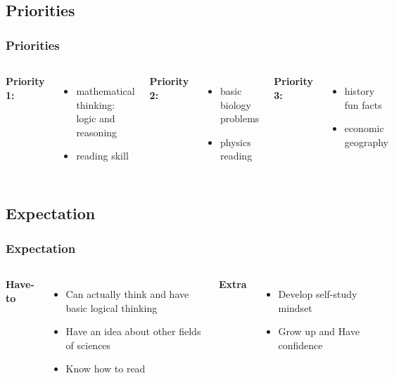 \documentclass{beamer}
\begin{document}
\subsection{Priorities}
\begin{frame}
    \frametitle{Priorities}
    \begin{columns}
        \textbf{Priority 1:}
        \begin{itemize}
            \item mathematical thinking: logic and reasoning
            \item reading skill
        \end{itemize}
        
        \textbf{Priority 2:}
        \begin{itemize}
            \item basic biology problems
            \item physics reading
        \end{itemize}
        \textbf{Priority 3:}
        \begin{itemize}
            \item history fun facts
            \item economic geography
        \end{itemize}
        \end{columns}
    \end{frame}
\subsection{Expectation}
\begin{frame}
    \frametitle{Expectation}
    \begin{columns}
        \textbf{Have-to}
        \begin{itemize}
            \item Can actually think and have basic logical thinking
            \item Have an idea about other fields of sciences
            \item Know how to read
        \end{itemize}
        
        \textbf{Extra}
        \begin{itemize}
            \item Develop self-study mindset
            \item Grow up and Have confidence
        \end{itemize}
        \end{columns}
    \end{frame}
\end{document}
